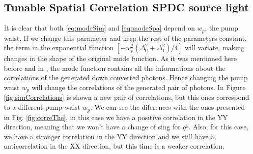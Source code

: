 \subsection{Tunable Spatial Correlation SPDC source light}
It is clear that both \ref{eq:modeSim} and \ref{eq:modeSpa} depend on $w_p$, the pump waist. If we change this 
parameter and keep the rest of the parameters constant, the term in the exponential function $[-w_p^2 (\Delta_0^2 + \Delta_1^2 )/4]$ will variate,
making changes in the shape of the original mode function. As it was mentioned here before and in \cite{omar}, the mode function
contains all the informations about the correlations of the generated down converted photons. Hence changing the pump waist $w_p$
will change the correlations of the generated pair of photons. In Figure \ref{fig:simCorrelations} is shown a new pair of correlations, but this
ones correspond to a different pump waist $w_p$. We can see the diferences with the ones presented in Fig. \ref{fig:correThe}, in this case we
have a positive correlation in the YY direction, meaning that we won't have a change of sing for $q^y$. Also, for this case, we have a stronger
correlation in the YY direction and we still have a anticorrelation in the XX direction, but this time is a weaker correlation.

